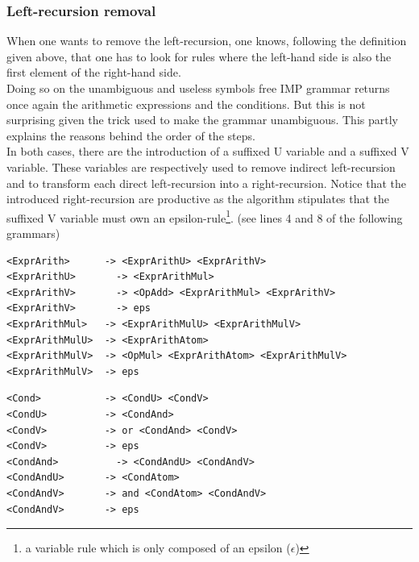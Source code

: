 \documentclass[a4paper,11pt]{article}
\begin{document}
    \subsubsection{Left-recursion removal}
      When one wants to remove the left-recursion, one knows, following the definition given above, that one has to look for rules where the left-hand side is also the first element of the right-hand side.\\
      Doing so on the unambiguous and useless symbols free IMP grammar returns once again the arithmetic expressions and the conditions. But this is not surprising given the trick used to make the grammar unambiguous. This partly explains the reasons behind the order of the steps.\\
      In both cases, there are the introduction of a suffixed U variable and a suffixed V variable. These variables are respectively used to remove indirect left-recursion and to transform each direct left-recursion into a right-recursion. Notice that the introduced right-recursion are productive as the algorithm stipulates that the suffixed V variable must own an epsilon-rule\footnote{\label{epsilonrule}a variable rule which is only composed of an epsilon ($\epsilon$)}. (see lines 4 and 8 of the following grammars)
      \begin{lstlisting}
<ExprArith>	     -> <ExprArithU> <ExprArithV>
<ExprArithU>	   -> <ExprArithMul>
<ExprArithV>	   -> <OpAdd> <ExprArithMul> <ExprArithV> 
<ExprArithV>	   -> eps
<ExprArithMul>	 -> <ExprArithMulU> <ExprArithMulV>
<ExprArithMulU>	 -> <ExprArithAtom> 
<ExprArithMulV>	 -> <OpMul> <ExprArithAtom> <ExprArithMulV> 
<ExprArithMulV>	 -> eps\end{lstlisting}
      \begin{lstlisting} 
<Cond>	         -> <CondU> <CondV>
<CondU>	         -> <CondAnd> 
<CondV>	         -> or <CondAnd> <CondV> 
<CondV>	         -> eps
<CondAnd>	       -> <CondAndU> <CondAndV>
<CondAndU>	     -> <CondAtom> 
<CondAndV>	     -> and <CondAtom> <CondAndV> 
<CondAndV>	     -> eps\end{lstlisting}
\end{document}
